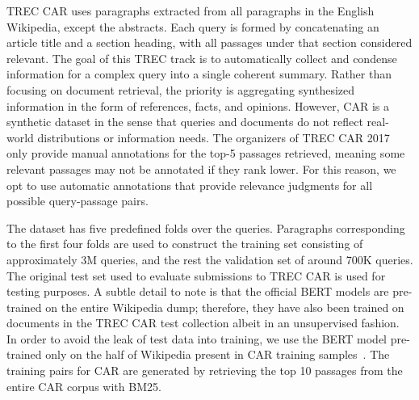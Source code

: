 
TREC CAR \cite{dietz2017trec} uses paragraphs extracted from all paragraphs in the English Wikipedia, except the abstracts.
Each query is formed by concatenating an article title and a section heading, with all passages under that section considered relevant.
The goal of this TREC track is to automatically collect and condense information for a complex query into a single coherent summary.
Rather than focusing on document retrieval, the priority is aggregating synthesized information in the form of references, facts, and opinions.
However, CAR is a synthetic dataset in the sense that queries and documents do not reflect real-world distributions or information needs.
The organizers of TREC CAR 2017 only provide manual annotations for the top-5 passages retrieved, meaning some relevant passages may not be annotated if they rank lower.
For this reason, we opt to use automatic annotations that provide relevance judgments for all possible query-passage pairs.

The dataset has five predefined folds over the queries.
Paragraphs corresponding to the first four folds are used to construct the training set consisting of approximately 3M queries, and the rest the validation set of around 700K queries.
The original test set used to evaluate submissions to TREC CAR is used for testing purposes.
A subtle detail to note is that the official BERT models are pre-trained on the entire Wikipedia dump; therefore, they have also been trained on documents in the TREC CAR test collection albeit in an unsupervised fashion.
In order to avoid the leak of test data into training, we use the BERT model pre-trained only on the half of Wikipedia present in CAR training samples~\cite{nogueira2019passage}.
The training pairs for CAR are generated by retrieving the top 10 passages from the entire CAR corpus with BM25.


